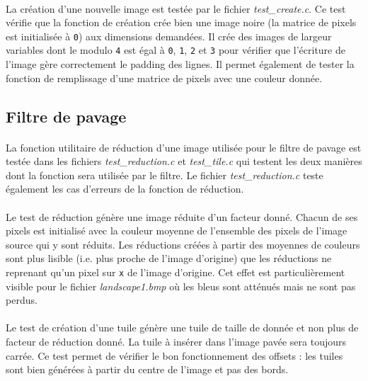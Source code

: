 \documentclass{article}
\begin{document}
    \paragraph{}
    La création d'une nouvelle image est testée par le fichier \emph{test\_create.c}. Ce test vérifie que la fonction de création crée bien une image noire (la matrice de pixels est initialisée à \texttt{0}) aux dimensions demandées. Il crée des images de largeur variables dont le modulo \texttt{4} est égal à \texttt{0}, \texttt{1}, \texttt{2} et \texttt{3} pour vérifier que l'écriture de l'image gère correctement le padding des lignes. Il permet également de tester la fonction de remplissage d'une matrice de pixels avec une couleur donnée.


    \subsection{Filtre de pavage}
    \paragraph{}
    La fonction utilitaire de réduction d'une image utilisée pour le filtre de pavage est testée dans les fichiers \emph{test\_reduction.c} et \emph{test\_tile.c} qui testent les deux manières dont la fonction sera utilisée par le filtre. Le fichier \emph{test\_reduction.c} teste également les cas d'erreurs de la fonction de réduction.

    \paragraph{}
    Le test de réduction génère une image réduite d'un facteur donné. Chacun de ses pixels est initialisé avec la couleur moyenne de l'ensemble des pixels de l'image source qui y sont réduits. Les réductions créées à partir des moyennes de couleurs sont plus lisible (i.e. plus proche de l'image d'origine) que les réductions ne reprenant qu'un pixel sur \texttt{x} de l'image d'origine. Cet effet est particulièrement visible pour le fichier \emph{landscape1.bmp} où les bleus sont atténués mais ne sont pas perdus.

    \paragraph{}
    Le test de création d'une tuile génère une tuile de taille de donnée et non plus de facteur de réduction donné. La tuile à insérer dans l'image pavée sera toujours carrée. Ce test permet de vérifier le bon fonctionnement des offsets : les tuiles sont bien générées à partir du centre de l'image et pas des bords.
\end{document}
